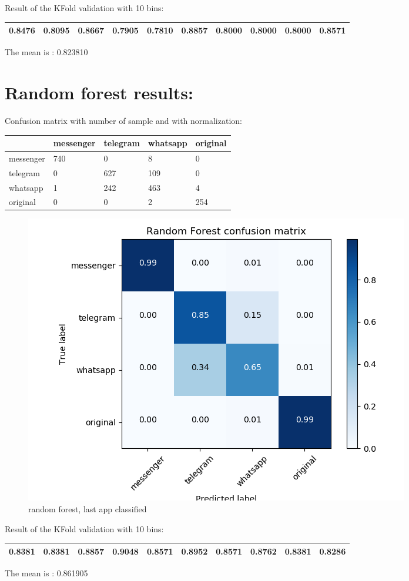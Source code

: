 Result of the KFold validation with 10 bins:
 {\def\arraystretch{1.3} 
 \begin{table}[H] 
\centering 
\begin{tabular}{|l |l |l |l |l |l |l |l |l |l |}  
\hline 
0.8476&
0.8095&
0.8667&
0.7905&
0.7810&
0.8857&
0.8000&
0.8000&
0.8000&
0.8571\\ \hline  

\end{tabular} 
\end{table} }

The mean is : 0.823810\section{Random forest results:} 
Confusion matrix with number of sample and with normalization:
 {\def\arraystretch{1.3} 
 \begin{table}[H] 
\centering 
\begin{tabular}{|l|l|l|l|l|} 
\hline 
  &messenger  &telegram  &whatsapp  &original  \\ \hline
messenger  &740  &0  &8  &0  \\ \hline
telegram  &0  &627  &109  &0  \\ \hline
whatsapp  &1  &242  &463  &4  \\ \hline
original  &0  &0  &2  &254  \\ \hline
\end{tabular} 
\end{table} }

 \begin{figure}[H] 
\centering 
\includegraphics[scale=.6]{images/new_met_rf_initial_double_simple.png} 
\caption{random forest, last app classified} 
\end{figure} 


Result of the KFold validation with 10 bins:
 {\def\arraystretch{1.3} 
 \begin{table}[H] 
\centering 
\begin{tabular}{|l |l |l |l |l |l |l |l |l |l |}  
\hline 
0.8381&
0.8381&
0.8857&
0.9048&
0.8571&
0.8952&
0.8571&
0.8762&
0.8381&
0.8286\\ \hline  

\end{tabular} 
\end{table} }

The mean is : 0.861905
